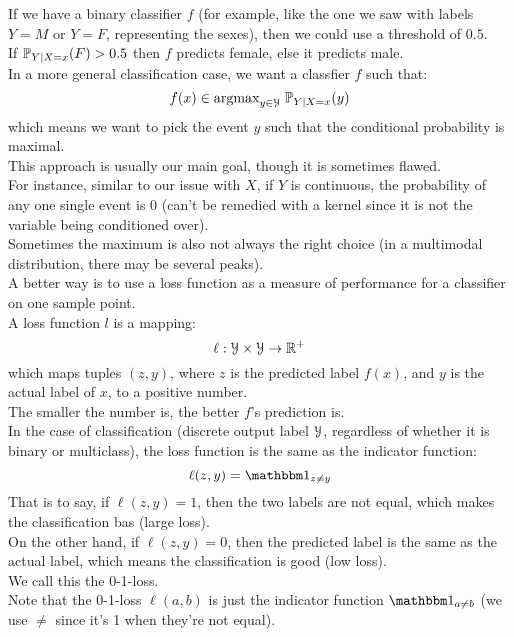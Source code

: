 \documentclass[12pt]{article}
\begin{document}
If we have a binary classifier $f$
(for example, like the one we saw
with labels $Y = M$ or $Y = F$,
representing the sexes),
then we could use a threshold of $0.5$. \\
If $\mathbb{P}_{Y \mid X = x}(F) > 0.5$
then $f$ predicts female, else it
predicts male. \\

In a more general classification case,
we want a classfier $f$ such that:
\[ f(x) \in \text{argmax}_{y \in \mathcal{Y}} \;
\mathbb{P}_{Y \mid X = x}(y) \]
which means we want to pick the event $y$
such that the conditional probability
is maximal. \\

This approach is usually our main goal,
though it is sometimes flawed. \\
For instance, similar to our issue
with $X$,
if $Y$ is continuous, the probability
of any one single event is $0$
(can't be remedied with a kernel
since it is not the variable being
conditioned over). \\
Sometimes the maximum is also not always
the right choice (in a multimodal
distribution, there may be several peaks). \\

A better way is to use a loss function
as a measure of performance for a
classifier on one sample point. \\
A loss function $l$ is a mapping:
\[ \ell: \mathcal{Y} \times \mathcal{Y}
\to \mathbb{R}^+ \]
which maps tuples $(z, y)$,
where $z$ is the predicted label $f(x)$,
and $y$ is the actual label of $x$,
to a positive number. \\
The smaller the number is,
the better $f$'s prediction is. \\

In the case of classification
(discrete output label $\mathcal{Y}$,
regardless of whether it is binary
or multiclass),
the loss function is the same as
the indicator function:
\[ \ell(z, y) = \indicator_{z \neq y} \]
That is to say,
if $\ell(z, y) = 1$,
then the two labels are not equal,
which makes the classification bas (large
loss). \\
On the other hand, if $\ell(z, y) = 0$,
then the predicted label is the same as
the actual label,
which means the classification is good
(low loss). \\
We call this the 0-1-loss. \\

Note that the 0-1-loss $\ell(a, b)$ is
just the indicator function
$\indicator_{a \neq b}$
(we use $\neq$ since it's 1 when they're
not equal). \\
\end{document}
